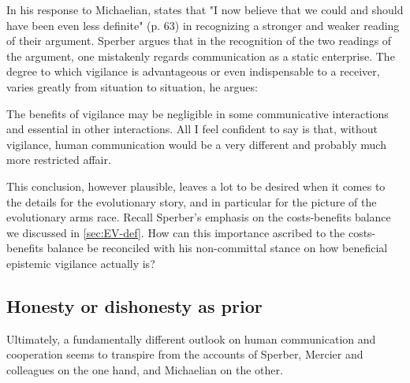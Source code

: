 In his response to Michaelian, \citet{Sperber13} states that "I now believe that we could and should have been even less definite" (p. 63) in recognizing a stronger and weaker reading of their argument. Sperber argues that in the recognition of the two readings of the argument, one mistakenly regards communication as a static enterprise. The degree to which vigilance is advantageous or even indispensable to a receiver, varies greatly from situation to situation, he argues:
\begin{quoting}
    The benefits of vigilance may be negligible in some communicative interactions and essential in other interactions. All I feel confident to say is that, without vigilance, human communication would be a very different and probably much more restricted affair.
    \hfill \citep[p.~63]{Sperber13}
\end{quoting}
This conclusion, however plausible, leaves a lot to be desired when it comes to the details for the evolutionary story, and in particular for the picture of the evolutionary arms race.
Recall Sperber's emphasis on the costs-benefits balance we discussed in \cref{sec:EV-def}. How can this importance ascribed to the costs-benefits balance be reconciled with his non-committal stance on how beneficial epistemic vigilance actually is?


\subsection{Honesty or dishonesty as prior}

Ultimately, a fundamentally different outlook on human communication and cooperation seems to transpire from the accounts of Sperber, Mercier and colleagues on the one hand, and Michaelian on the other.

